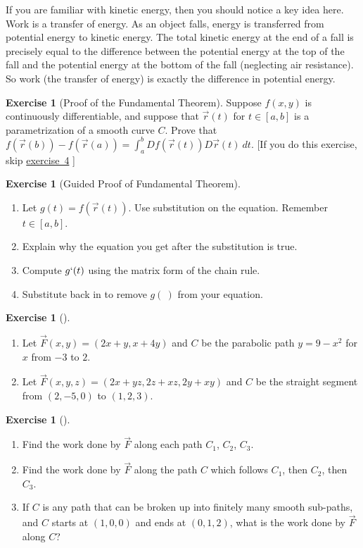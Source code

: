 \documentclass[10pt,]{book}
\theoremstyle{plain}
\theoremstyle{definition}
\theoremstyle{definition}
\theoremstyle{definition}
\theoremstyle{definition}
\newtheorem{exploration}[project]{Exercise}
\theoremstyle{definition}
\numberwithin{equation}{section}
\begin{document}
If you are familiar with kinetic energy, then you should notice a key idea here. Work is a transfer of energy. As an object falls, energy is transferred from potential energy to kinetic energy. The total kinetic energy at the end of a fall is precisely equal to the difference between the potential energy at the top of the fall and the potential energy at the bottom of the fall (neglecting air resistance). So work (the transfer of energy) is exactly the difference in potential energy.%
\begin{exploration}[Proof of the Fundamental Theorem]\label{exploration-206}
Suppose \(f(x,y)\) is continuously differentiable, and suppose that \(\vec r(t)\) for \(t\in[a,b]\) is a parametrization of a smooth curve \(C\). Prove that \(f(\vec r(b))-f(\vec r(a)) = \int_a^b Df(\vec r(t))D\vec r(t)\ dt\). [If you do this exercise, skip \hyperref[prob_proof_of_fundamental_thm2]{exercise~4} ]%
\end{exploration}
\begin{exploration}[Guided Proof of Fundamental Theorem]\label{prob_proof_of_fundamental_thm2}
\leavevmode%
\begin{enumerate}[font=\bfseries,label=(\alph*),ref=\alph*]
\item\label{task-530} Let \(g(t) = f(\vec r(t))\). Use substitution on the equation. Remember \(t \in [a,b]\).%
\item\label{task-531} Explain why the equation you get after the substitution is true.%
\item\label{task-532} Compute \(g`(t)\) using the matrix form of the chain rule.%
\item\label{task-533} Substitute back in to remove \(g(\ )\) from your equation.%
\end{enumerate}
\end{exploration}
\begin{exploration}[]\label{exploration-208}
\leavevmode%
\begin{enumerate}[font=\bfseries,label=(\alph*),ref=\alph*]
\item\label{task-534} Let \(\vec F(x,y) = (2x+y,x+4y)\) and \(C\) be the parabolic path \(y=9-x^2\) for \(x\) from \(-3\) to \(2\).%
\item\label{task-535} Let \(\vec F(x,y,z) = (2x+yz,2z+xz,2y+xy)\) and \(C\) be the straight segment from \((2,-5,0)\) to \((1,2,3)\).%
\end{enumerate}
\end{exploration}
\begin{exploration}[]\label{exploration-209}
\leavevmode%
\begin{enumerate}[font=\bfseries,label=(\alph*),ref=\alph*]
\item\label{task-536} Find the work done by \(\vec F\) along each path \(C_1\), \(C_2\), \(C_3\).  %
\item\label{task-537} Find the work done by \(\vec F\) along the path \(C\) which follows \(C_1\), then \(C_2\), then \(C_3\).%
\item\label{task-538} If \(C\) is any path that can be broken up into finitely many smooth sub-paths, and \(C\) starts at \((1,0,0)\) and ends at \((0,1,2)\), what is the work done by \(\vec F\) along \(C\)?%
\end{enumerate}
\end{exploration}
\end{document}
